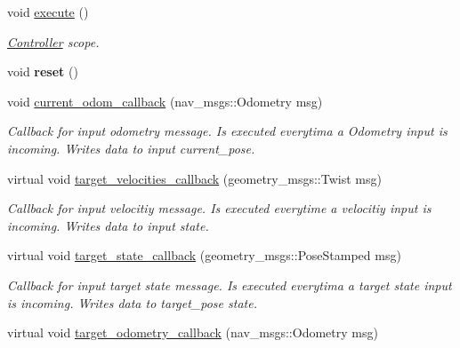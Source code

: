 \begin{DoxyCompactItemize}
\item 
void \hyperlink{classController_a6661eb7307219216a7cb0a90e2a07e4d}{execute} ()\hypertarget{classController_a6661eb7307219216a7cb0a90e2a07e4d}{}\label{classController_a6661eb7307219216a7cb0a90e2a07e4d}

\begin{DoxyCompactList}\small\item\em \hyperlink{classController}{Controller} scope. \end{DoxyCompactList}\item 
void {\bfseries reset} ()\hypertarget{classController_ab5515748f1b0c82f015e039c817ee5f7}{}\label{classController_ab5515748f1b0c82f015e039c817ee5f7}

\item 
void \hyperlink{classController_a35b38608f67e7c1c34f6b7186db32ad7}{current\+\_\+odom\+\_\+callback} (nav\+\_\+msgs\+::\+Odometry msg)\hypertarget{classController_a35b38608f67e7c1c34f6b7186db32ad7}{}\label{classController_a35b38608f67e7c1c34f6b7186db32ad7}

\begin{DoxyCompactList}\small\item\em Callback for input odometry message. Is executed everytima a Odometry input is incoming. Writes data to input current\+\_\+pose. \end{DoxyCompactList}\item 
virtual void \hyperlink{classController_afa31080c1ed1e652410c5e97472b3ea5}{target\+\_\+velocities\+\_\+callback} (geometry\+\_\+msgs\+::\+Twist msg)\hypertarget{classController_afa31080c1ed1e652410c5e97472b3ea5}{}\label{classController_afa31080c1ed1e652410c5e97472b3ea5}

\begin{DoxyCompactList}\small\item\em Callback for input velocitiy message. Is executed everytime a velocitiy input is incoming. Writes data to input state. \end{DoxyCompactList}\item 
virtual void \hyperlink{classController_a60f59dd761ce2d41dc9254f87164ded1}{target\+\_\+state\+\_\+callback} (geometry\+\_\+msgs\+::\+Pose\+Stamped msg)\hypertarget{classController_a60f59dd761ce2d41dc9254f87164ded1}{}\label{classController_a60f59dd761ce2d41dc9254f87164ded1}

\begin{DoxyCompactList}\small\item\em Callback for input target state message. Is executed everytima a target state input is incoming. Writes data to target\+\_\+pose state. \end{DoxyCompactList}\item 
virtual void \hyperlink{classController_ad9ccaff0c6f9989bd6c33a3d2179124d}{target\+\_\+odometry\+\_\+callback} (nav\+\_\+msgs\+::\+Odometry msg)\hypertarget{classController_ad9ccaff0c6f9989bd6c33a3d2179124d}{}\label{classController_ad9ccaff0c6f9989bd6c33a3d2179124d}


\end{DoxyCompactItemize}
